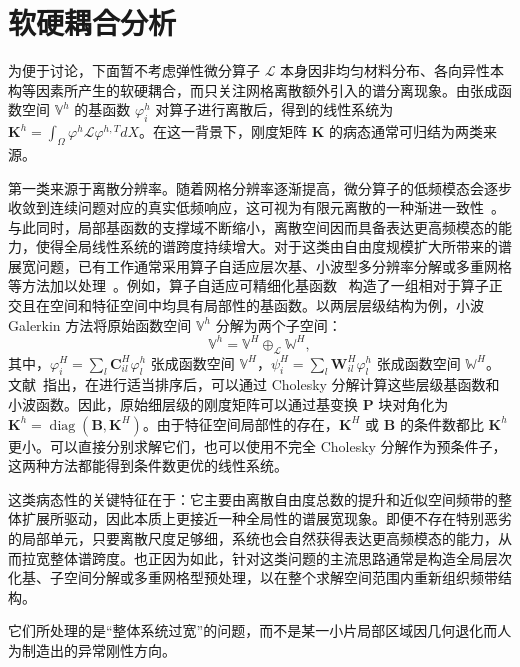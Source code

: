 \section{软硬耦合分析}

为便于讨论，下面暂不考虑弹性微分算子 $\mathcal{L}$ 本身因非均匀材料分布、各向异性本构等因素所产生的软硬耦合，而只关注网格离散额外引入的谱分离现象。由张成函数空间 $\mathbb{V}^h$ 的基函数 $\varphi^h_i$ 对算子进行离散后，得到的线性系统为 $\mathbf{K}^h = \int_{\Omega} \varphi^h \mathcal{L} \varphi^{h,T} dX$。在这一背景下，刚度矩阵 $\mathbf{K}$ 的病态通常可归结为两类来源。

第一类来源于离散分辨率。随着网格分辨率逐渐提高，微分算子的低频模态会逐步收敛到连续问题对应的真实低频响应，这可视为有限元离散的一种渐进一致性~\cite{wang2003finite}。与此同时，局部基函数的支撑域不断缩小，离散空间因而具备表达更高频模态的能力，使得全局线性系统的谱跨度持续增大。对于这类由自由度规模扩大所带来的谱展宽问题，已有工作通常采用算子自适应层次基、小波型多分辨率分解或多重网格等方法加以处理~\cite{Budninskiy_2019_wavelet, chen2019material, zhu2010multigridElas}。例如，算子自适应可精细化基函数~\cite{chen2019material,Budninskiy_2019_wavelet} 构造了一组相对于算子正交且在空间和特征空间中均具有局部性的基函数。以两层层级结构为例，小波 Galerkin 方法将原始函数空间 $\mathbb{V}^h$ 分解为两个子空间：
\begin{equation}
  \mathbb{V}^{h} = \mathbb{V}^H \oplus_{\mathcal{L}} \mathbb{W}^H,
\end{equation}
其中，$\varphi^H_i = \sum_{l} \mathbf{C}^H_{il} \varphi^h_l$ 张成函数空间 $\mathbb{V}^H$，$\psi^H_i = \sum_l \mathbf{W}^H_{il} \varphi^h_l$ 张成函数空间 $\mathbb{W}^H$。文献~\cite{chen_multiscale_2021}指出，在进行适当排序后，可以通过 Cholesky 分解计算这些层级基函数和小波函数。因此，原始细层级的刚度矩阵可以通过基变换 $\mathbf{P}$ 块对角化为 $\mathbf{K}^h = \operatorname{diag}(\mathbf{B}, \mathbf{K}^H)$。由于特征空间局部性的存在，$\mathbf{K}^H$ 或 $\mathbf{B}$ 的条件数都比 $\mathbf{K}^h$ 更小。可以直接分别求解它们，也可以使用不完全 Cholesky 分解作为预条件子，这两种方法都能得到条件数更优的线性系统。

这类病态性的关键特征在于：它主要由离散自由度总数的提升和近似空间频带的整体扩展所驱动，因此本质上更接近一种全局性的谱展宽现象。即便不存在特别恶劣的局部单元，只要离散尺度足够细，系统也会自然获得表达更高频模态的能力，从而拉宽整体谱跨度。也正因为如此，针对这类问题的主流思路通常是构造全局层次化基、子空间分解或多重网格型预处理，以在整个求解空间范围内重新组织频带结构。

它们所处理的是“整体系统过宽”的问题，而不是某一小片局部区域因几何退化而人为制造出的异常刚性方向。

